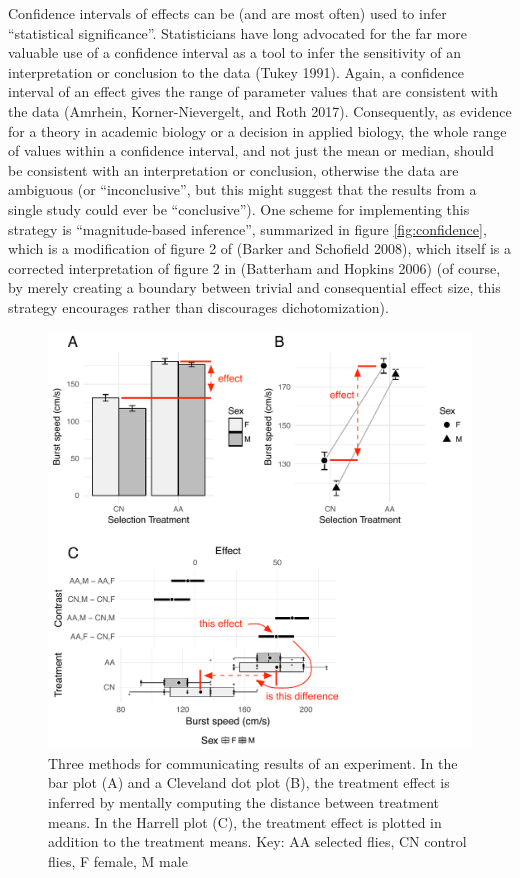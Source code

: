 \documentclass[fleqn,10pt,lineno]{wlpeerj} %
\theoremstyle{definition}
\theoremstyle{definition}
\theoremstyle{definition}
\theoremstyle{remark}
\begin{document}
Confidence intervals of effects can be (and are most often) used to
infer ``statistical significance''. Statisticians have long advocated
for the far more valuable use of a confidence interval as a tool to
infer the sensitivity of an interpretation or conclusion to the data
(Tukey 1991). Again, a confidence interval of an effect gives the range
of parameter values that are consistent with the data (Amrhein,
Korner-Nievergelt, and Roth 2017). Consequently, as evidence for a
theory in academic biology or a decision in applied biology, the whole
range of values within a confidence interval, and not just the mean or
median, should be consistent with an interpretation or conclusion,
otherwise the data are ambiguous (or ``inconclusive'', but this might
suggest that the results from a single study could ever be
``conclusive''). One scheme for implementing this strategy is
``magnitude-based inference'', summarized in figure
\ref{fig:confidence}, which is a modification of figure 2 of (Barker and
Schofield 2008), which itself is a corrected interpretation of figure 2
in (Batterham and Hopkins 2006) (of course, by merely creating a
boundary between trivial and consequential effect size, this strategy
encourages rather than discourages dichotomization).

\begin{figure}
\includegraphics[width=1\linewidth]{../figs/fig1} \caption{Three methods for communicating results of an experiment. In the bar plot (A) and a Cleveland dot plot (B), the treatment effect is inferred by mentally computing the distance between treatment means. In the Harrell plot (C), the treatment effect is plotted in addition to the treatment means. Key: AA selected flies, CN control flies, F female, M male}\label{fig:plots}
\end{figure}
\end{document}
